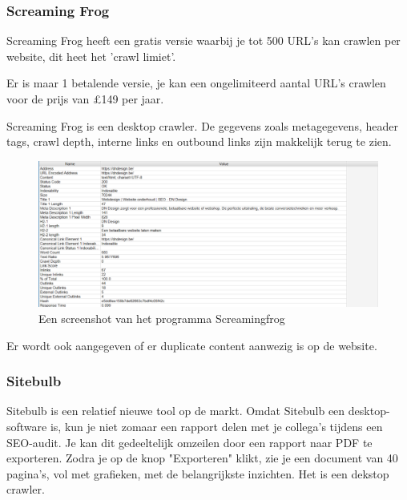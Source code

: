 \subsubsection{Screaming Frog}
\label{ch: Screaming Frog}

Screaming Frog heeft een gratis versie waarbij je tot 500 URL's kan crawlen per website, dit heet het 'crawl limiet'. 

Er is maar 1 betalende versie, je kan een ongelimiteerd aantal URL's crawlen voor de prijs van £149 per jaar. 

Screaming Frog is een desktop crawler. De gegevens zoals metagegevens, header tags, crawl depth, interne links en outbound links zijn makkelijk terug te zien. 

\begin{figure}[h!]
\centering
\includegraphics[width=\linewidth]{img/screamingfrog.PNG}
\caption{Een screenshot van het programma Screamingfrog
\autocite{screamingfrog}}
\end{figure}

Er wordt ook aangegeven of er duplicate content aanwezig is op de website. 

\subsubsection{Sitebulb}
\label{ch: Sitebulb}

Sitebulb is een relatief nieuwe tool op de markt. Omdat Sitebulb een desktop-software is, kun je niet zomaar een rapport delen met je collega's tijdens een SEO-audit. Je kan dit gedeeltelijk omzeilen door een rapport naar PDF te exporteren. Zodra je op de knop "Exporteren" klikt, zie je een document van 40 pagina's, vol met grafieken, met de belangrijkste inzichten. Het is een dekstop crawler. 

